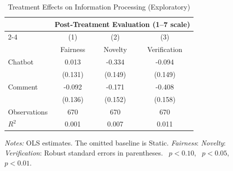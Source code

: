\begin{table}[htbp]
\centering
\caption{Treatment Effects on Information Processing (Exploratory)}
\label{tab:mechanisms}
\begin{tabular}{l*{3}{c}}
\toprule
 & \multicolumn{3}{c}{Post-Treatment Evaluation (1--7 scale)} \\
\cmidrule(lr){2-4}
                    &\multicolumn{1}{c}{(1)}&\multicolumn{1}{c}{(2)}&\multicolumn{1}{c}{(3)}\\
                    &\multicolumn{1}{c}{Fairness}&\multicolumn{1}{c}{Novelty}&\multicolumn{1}{c}{Verification}\\
\midrule
Chatbot             &       0.013         &      -0.334\sym{**} &      -0.094         \\
                    &     (0.131)         &     (0.149)         &     (0.149)         \\
\addlinespace
Comment             &      -0.092         &      -0.171         &      -0.408\sym{**} \\
                    &     (0.136)         &     (0.152)         &     (0.158)         \\
\midrule
Observations        &         670         &         670         &         670         \\
$R^2$               &       0.001         &       0.007         &       0.011         \\
\bottomrule
\end{tabular}
\par\vspace{4pt}
\begin{minipage}{\textwidth}
\footnotesize \textit{Notes:} OLS estimates. The omitted baseline is Static. \textit{Fairness}:  \textit{Novelty}:  \textit{Verification}:  Robust standard errors in parentheses. \sym{*}~$p<0.10$, \sym{**}~$p<0.05$, \sym{***}~$p<0.01$.
\end{minipage}
\end{table}
